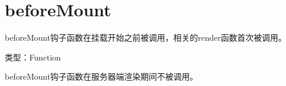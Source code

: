 \begin{lstlisting}[language=JavaScript]

\end{lstlisting}




\begin{lstlisting}[language=JavaScript]

\end{lstlisting}




\begin{lstlisting}[language=JavaScript]

\end{lstlisting}




\begin{lstlisting}[language=JavaScript]

\end{lstlisting}







\section{beforeMount}

beforeMount钩子函数在挂载开始之前被调用，相关的render函数首次被调用。



\begin{compactitem}
\item 类型：Function
\end{compactitem}

beforeMount钩子函数在服务器端渲染期间不被调用。






\begin{lstlisting}[language=JavaScript]

\end{lstlisting}




\begin{lstlisting}[language=JavaScript]

\end{lstlisting}




\begin{lstlisting}[language=JavaScript]

\end{lstlisting}




